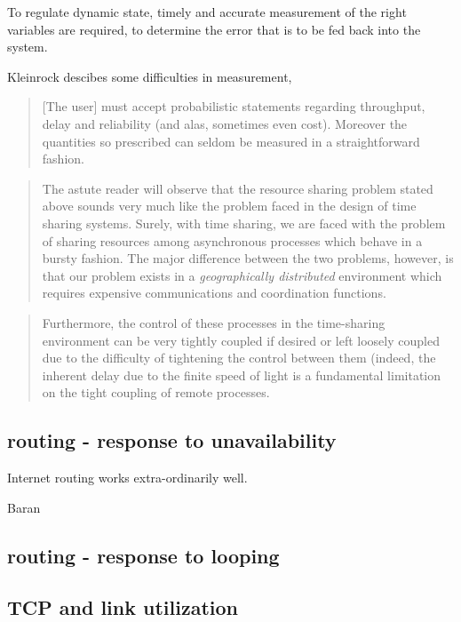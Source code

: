 To regulate dynamic state, timely and accurate measurement of the right variables are required, to
determine the error that is to be fed back into the system.

Kleinrock descibes some difficulties in measurement\cite{kleinrock1978},

\begin{quote}
    [The user] must accept probabilistic statements regarding throughput, delay and reliability (and
    alas, sometimes even cost). Moreover the quantities so prescribed can seldom be measured in a
    straightforward fashion.
\end{quote}

\begin{quote}
    The astute reader will observe that the resource sharing problem stated above sounds very much
    like the problem faced in the design of time sharing systems. Surely, with time sharing, we are
    faced with the problem of sharing resources among asynchronous processes which behave in a
    bursty fashion. The major difference between the two problems, however, is that our problem
    exists in a \emph{geographically distributed} environment which requires expensive
    communications and coordination functions.
\end{quote}

\begin{quote}
    Furthermore, the control of these processes in the time-sharing environment can be very tightly
    coupled if desired or left loosely coupled due to the difficulty of tightening the control
    between them (indeed, the inherent delay due to the finite speed of light is a fundamental
    limitation on the tight coupling of remote processes.
\end{quote}

\subsection{routing - response to unavailability}

Internet routing works extra-ordinarily well.

Baran

\subsection{routing - response to looping}

\subsection{TCP and link utilization}

